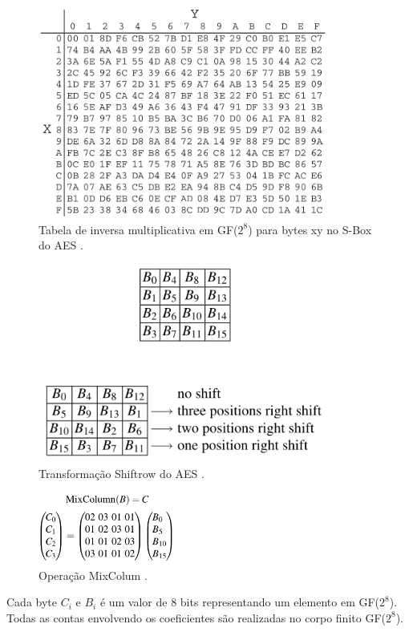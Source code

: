 \begin{frame}[allowframebreaks]
 \framebreak

\begin{figure}[h]
\centering
\includegraphics[width=0.85\textwidth,height=0.65\textheight,keepaspectratio]{figures/AES-SBox-GFinv.png}
\caption{Tabela de inversa multiplicativa em GF($2^8$) para bytes xy no S-Box do AES \cite{paar2014}.}
\label{fig-AES-SBox-GFinv}
\end{figure}

 \framebreak

\begin{figure}[h]
\centering
\includegraphics[width=0.85\textwidth,height=0.65\textheight,keepaspectratio]{figures/AES-shiftrow.png}
\caption{Transformação Shiftrow do AES \cite{paar2014}.}
\label{fig-AES-shiftrow}
\end{figure}

 \framebreak

\begin{figure}[h]
\centering
\includegraphics[width=0.4\textwidth,height=0.4\textheight,keepaspectratio]{figures/AES-mixcolumns.png}
\caption{Operação MixColum \cite{paar2014}.}
\label{fig-AES-mixcolumns}
\end{figure}
Cada byte $C_i$ e $B_i$ é um valor de 8 bits representando um elemento em GF($2^8$). 
Todas as contas envolvendo os coeficientes são realizadas no corpo finito GF($2^8$).


\end{frame}
